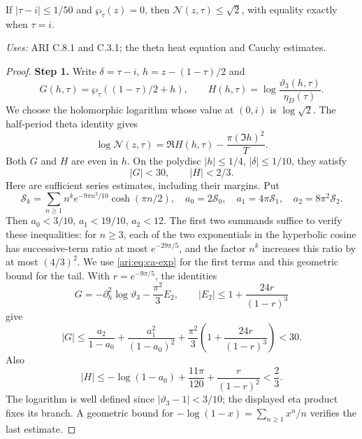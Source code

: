\begin{proposition}\label{ari:C.8.2}
If $|\tau-i|\le1/50$ and $\wp_\tau(z)=0$, then
$\mathcal N(z,\tau)\le\sqrt2$, with equality exactly when $\tau=i$.
\end{proposition}
\noindent\textit{Uses:} ARI C.8.1 and C.3.1; the theta heat equation and Cauchy estimates.\par
\begin{proof}
\noindent\textbf{Step 1.} Write $\delta=\tau-i$, $h=z-(1-\tau)/2$ and
\[
 G(h,\tau)=\wp_\tau((1-\tau)/2+h),\qquad
 H(h,\tau)=\log\frac{\vartheta_3(h,\tau)}{\eta_D(\tau)}.
\]
We choose the holomorphic logarithm whose value at $(0,i)$ is
$\log\sqrt2$. The half-period theta identity gives
\begin{equation}\label{ari:eq:ca-H}
 \log \mathcal N(z,\tau)=\Re H(h,\tau)-\frac{\pi(\Im h)^2}{T}.
\end{equation}
Both $G$ and $H$ are even in $h$. On the polydisc
$|h|\le1/4$, $|\delta|\le1/10$, they satisfy
\begin{equation}\label{ari:eq:ca-GHbounds}
 |G|<30,\qquad |H|<2/3.
\end{equation}
Here are sufficient series estimates, including their margins.
Put
\[
 \mathcal S_k=\sum_{n\ge1}n^k e^{-9\pi n^2/10}\cosh(\pi n/2),
 \quad a_0=2\mathcal S_0,\quad a_1=4\pi \mathcal S_1,\quad a_2=8\pi^2\mathcal S_2.
\]
Then $a_0<3/10$, $a_1<19/10$, $a_2<12$.
The first two summands suffice to verify these inequalities: for
$n\ge3$, each of the two exponentials in the hyperbolic cosine
has successive-term ratio at most $e^{-29\pi/5}$, and the
factor $n^k$ increases this ratio by at most $(4/3)^2$.
We use \eqref{ari:eq:ca-exp} for the first terms and this geometric
bound for the tail. With $r=e^{-9\pi/5}$, the identities
\[
 G=-\partial_h^2\log\vartheta_3-\frac{\pi^2}{3}E_2,
 \qquad
 |E_2|\le1+\frac{24r}{(1-r)^3}
\]
give
\[
 |G|\le\frac{a_2}{1-a_0}+\frac{a_1^2}{(1-a_0)^2}
       +\frac{\pi^2}{3}\left(1+\frac{24r}{(1-r)^3}\right)<30.
\]
Also
\[
 |H|\le-\log(1-a_0)+\frac{11\pi}{120}
                    +\frac{r}{(1-r)^2}<\frac23.
\]
The logarithm is well defined since $|\vartheta_3-1|<3/10$;
the displayed eta product fixes its branch. A geometric bound
for $-\log(1-x)=\sum_{n\ge1}x^n/n$ verifies the last estimate.



\end{proof}
